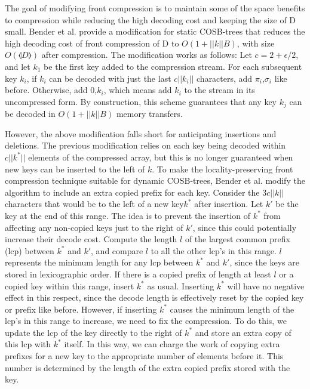 \documentclass{style}
\begin{document}
The goal of modifying front compression is to maintain some of the space
benefits to compression while reducing the high decoding cost and keeping the
size of D small. Bender et al. provide a modification for static COSB-trees
that reduces the high decoding cost of front compression of D to
$O(1+||k||B)$, with size $O(\llangle{D}\rrangle{})$ after compression. The
modification works as follows: Let $c = 2 + \epsilon/2$, and let $k_{1}$ be
the first key added to the compression stream. For each subsequent key
$k_{i}$, if $k_{i}$ can be decoded with just the last $c||k_{i}||$ characters,
add $\pi_{i}$,$\sigma_{i}$ like before. Otherwise, add 0,$k_{i}$, which means
add $k_{i}$ to the stream in its uncompressed form. By construction, this
scheme guarantees that any key $k_{j}$ can be decoded in $O(1+||k||B)$ memory
transfers.%

However, the above modification falls short for anticipating insertions and
deletions. The previous modification relies on each key being decoded within
$c||k^{*}||$ elements of the compressed array, but this is no longer
guaranteed when new keys can be inserted to the left of $k$. To make the
locality-preserving front compression technique suitable for dynamic
COSB-trees, Bender et al. modify the algorithm to include an extra copied
prefix for each key. Consider the $3c||k||$ characters that would be to the
left of a new key$k^{*}$ after insertion. Let $k'$ be the key at the end of
this range. The idea is to prevent the insertion of $k^{*}$ from affecting any
non-copied keys just to the right of $k'$, since this could potentially
increase their decode cost. Compute the length $l$ of the largest common
prefix (lcp) between $k^{*}$ and $k'$, and compare $l$ to all the other lcp's
in this range. $l$ represents the minimum length for any lcp between $k^{*}$
and $k'$, since the keys are stored in lexicographic order. If there is a
copied prefix of length at least $l$ or a copied key within this range, insert
$k^{*}$ as usual. Inserting $k^{*}$ will have no negative effect in this
respect, since the decode length is effectively reset by the copied key or
prefix like before. However, if inserting $k^{*}$ causes the minimum length of
the lcp's in this range to increase, we need to fix the compression. To do
this, we update the lcp of the key directly to the right of $k^{*}$ and store
an extra copy of this lcp with $k^{*}$ itself. In this way, we can charge the
work of copying extra prefixes for a new key to the appropriate number of
elements before it. This number is determined by the length of the extra
copied prefix stored with the key.
\end{document}
